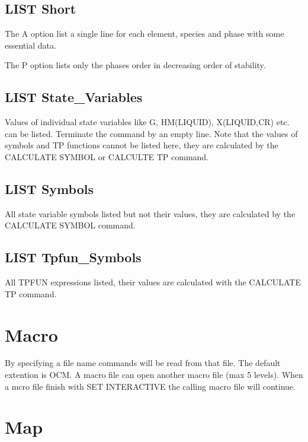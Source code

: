\documentclass[12pt]{article}
\begin{document}
\subsection{LIST Short}

The A option list a single line for each element, species and phase
with some essential data.

The P option lists only the phases order in decreasing order of
stability.

\subsection{LIST State\_Variables}

Values of individual state variables like G, HM(LIQUID), X(LIQUID,CR)
etc. can be listed.  Terminate the command by an empty line.  Note
that the values of symbols and TP functions cannot be listed here,
they are calculated by the CALCULATE SYMBOL or CALCULTE TP command.

\subsection{LIST Symbols}

All state variable symbols listed but not their values, they are
calculated by the CALCULATE SYMBOL command.

\subsection{LIST Tpfun\_Symbols}

All TPFUN expressions listed, their values are calculated with the
CALCULATE TP command.

\section{Macro }

By specifying a file name commands will be read from that file.  The
default extention is OCM.  A macro file can open another macro file
(max 5 levels).  When a mcro file finish with SET INTERACTIVE the
calling macro file will continue.

\section{Map }
\end{document}
